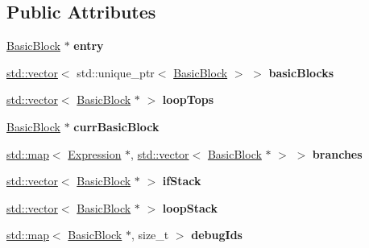 \subsection*{Public Attributes}
\begin{DoxyCompactItemize}
\item 
\mbox{\label{structwasm_1_1_c_f_g_walker_a78d7db57b19465cde51de1a4e5d7cb71}} 
\mbox{\hyperlink{structwasm_1_1_c_f_g_walker_1_1_basic_block}{Basic\+Block}} $\ast$ {\bfseries entry}
\item 
\mbox{\label{structwasm_1_1_c_f_g_walker_a80f12f52acc3743c813bf8765e96099c}} 
\mbox{\hyperlink{classstd_1_1vector}{std\+::vector}}$<$ std\+::unique\+\_\+ptr$<$ \mbox{\hyperlink{structwasm_1_1_c_f_g_walker_1_1_basic_block}{Basic\+Block}} $>$ $>$ {\bfseries basic\+Blocks}
\item 
\mbox{\label{structwasm_1_1_c_f_g_walker_a2123191833d65ffa66e45d007f1f2f41}} 
\mbox{\hyperlink{classstd_1_1vector}{std\+::vector}}$<$ \mbox{\hyperlink{structwasm_1_1_c_f_g_walker_1_1_basic_block}{Basic\+Block}} $\ast$ $>$ {\bfseries loop\+Tops}
\item 
\mbox{\label{structwasm_1_1_c_f_g_walker_ab9c6cf1f91a02ab17a5f2b1085b1c7be}} 
\mbox{\hyperlink{structwasm_1_1_c_f_g_walker_1_1_basic_block}{Basic\+Block}} $\ast$ {\bfseries curr\+Basic\+Block}
\item 
\mbox{\label{structwasm_1_1_c_f_g_walker_a304ad5e5a58d935a92b74a7e32b46450}} 
\mbox{\hyperlink{classstd_1_1map}{std\+::map}}$<$ \mbox{\hyperlink{classwasm_1_1_expression}{Expression}} $\ast$, \mbox{\hyperlink{classstd_1_1vector}{std\+::vector}}$<$ \mbox{\hyperlink{structwasm_1_1_c_f_g_walker_1_1_basic_block}{Basic\+Block}} $\ast$ $>$ $>$ {\bfseries branches}
\item 
\mbox{\label{structwasm_1_1_c_f_g_walker_a0aba244d605dd7d35c9427812659b2dd}} 
\mbox{\hyperlink{classstd_1_1vector}{std\+::vector}}$<$ \mbox{\hyperlink{structwasm_1_1_c_f_g_walker_1_1_basic_block}{Basic\+Block}} $\ast$ $>$ {\bfseries if\+Stack}
\item 
\mbox{\label{structwasm_1_1_c_f_g_walker_a1a35ae1b91925912395ea7d7ee3a77b3}} 
\mbox{\hyperlink{classstd_1_1vector}{std\+::vector}}$<$ \mbox{\hyperlink{structwasm_1_1_c_f_g_walker_1_1_basic_block}{Basic\+Block}} $\ast$ $>$ {\bfseries loop\+Stack}
\item 
\mbox{\label{structwasm_1_1_c_f_g_walker_aad19dda9a6d9ec3fb0955d6f9dc4e62f}} 
\mbox{\hyperlink{classstd_1_1map}{std\+::map}}$<$ \mbox{\hyperlink{structwasm_1_1_c_f_g_walker_1_1_basic_block}{Basic\+Block}} $\ast$, size\+\_\+t $>$ {\bfseries debug\+Ids}
\end{DoxyCompactItemize}
